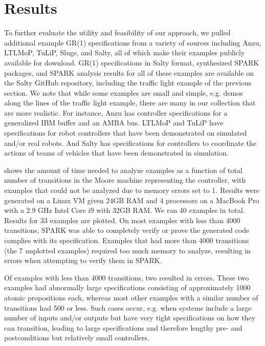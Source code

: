 \documentclass[runningheads]{llncs}
\begin{document}
\section{Results}
\label{sec:caseStudies}

To further evaluate the utility and feasibility of our approach, we pulled additional example GR(1) specifications from a variety of sources including 
Anzu, LTLMoP, TuLiP, Slugs, and Salty, all of which make their examples publicly available for download. 
GR(1) specifications in Salty format, synthesized SPARK packages, and SPARK analysis results for all of these examples are available on the 
Salty GitHub repository, including the traffic light example of the previous section. 
We note that while some examples are small and simple, e.g. demos along the lines of the traffic light example, 
there are many in our collection that are more realistic. 
For instance, Anzu has controller specifications for a generalized IBM buffer and an AMBA bus. 
LTLMoP and TuLiP have specifications for robot controllers that have been demonstrated on simulated and/or real robots. 
And Salty has specifications for controllers to coordinate the actions of teams of vehicles that have been demonstrated in simulation. 

 shows the amount of time needed to analyze examples as a function of total number of transitions 
in the Moore machine representing the controller, 
with examples that could not be analyzed due to memory errors set to 1. 
Results were generated on a Linux VM given 24GB RAM and 4 processors on a MacBook Pro with a 2.9 GHz Intel Core i9 with 32GB RAM.
We ran 40 examples in total. 
Results for 33 examples are plotted. 
On most examples with less than 4000 transitions, 
SPARK was able to completely verify or prove the generated code complies with its specification. 
Examples that had more than 4000 transitions (the 7 unplotted examples) required too much memory to analyze, 
resulting in errors when attempting to verify them in SPARK. 

Of examples with less than 4000 transitions, two resulted in errors. 
These two examples had abnormally large specifications consisting of approximately 1000 atomic propositions each, 
whereas most other examples with a similar number of transitions had 500 or less. 
Such cases occur, e.g. when systems include a large number of inputs and/or outputs but have very tight specifications on 
how they can transition, leading to large specifications and therefore lengthy pre- and postconditions but relatively small controllers.
\end{document}
